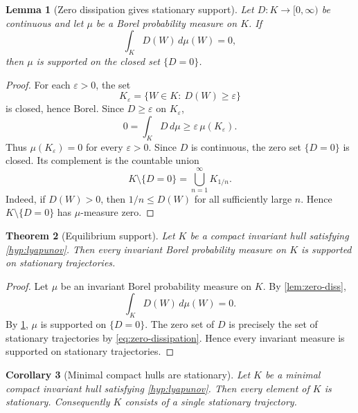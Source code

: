 \documentclass[11pt]{amsart}
\theoremstyle{plain}
\newtheorem{theorem}{Theorem}[section]
\newtheorem{lemma}[theorem]{Lemma}
\newtheorem{corollary}[theorem]{Corollary}
\theoremstyle{definition}
\theoremstyle{remark}
\numberwithin{equation}{section}
\begin{document}
\begin{lemma}[Zero dissipation gives stationary support]\label{lem:support-zero-d}
Let \(D:K\to[0,\infty)\) be continuous and let \(\mu\) be a Borel probability
measure on \(K\).  If
\[
   \int_KD(W)\,d\mu(W)=0,
\]
then \(\mu\) is supported on the closed set \(\{D=0\}\).
\end{lemma}

\begin{proof}
For each \(\varepsilon>0\), the set
\[
   K_\varepsilon=\{W\in K:\ D(W)\ge\varepsilon\}
\]
is closed, hence Borel.  Since \(D\ge\varepsilon\) on \(K_\varepsilon\),
\[
   0=\int_KD\,d\mu\ge\varepsilon\,\mu(K_\varepsilon).
\]
Thus \(\mu(K_\varepsilon)=0\) for every \(\varepsilon>0\).  Since \(D\) is
continuous, the zero set \(\{D=0\}\) is closed.  Its complement is the
countable union
\[
   K\setminus\{D=0\}
   =
   \bigcup_{n=1}^\infty K_{1/n}.
\]
Indeed, if \(D(W)>0\), then \(1/n\le D(W)\) for all sufficiently large \(n\).
Hence \(K\setminus\{D=0\}\) has \(\mu\)-measure zero.
\end{proof}

\begin{theorem}[Equilibrium support]\label{thm:equilibrium-support}
Let \(K\) be a compact invariant hull satisfying \cref{hyp:lyapunov}.  Then
every invariant Borel probability measure on \(K\) is supported on stationary
trajectories.
\end{theorem}

\begin{proof}
Let \(\mu\) be an invariant Borel probability measure on \(K\).  By
\cref{lem:zero-diss},
\[
   \int_KD(W)\,d\mu(W)=0 .
\]
By \cref{lem:support-zero-d}, \(\mu\) is supported on \(\{D=0\}\).  The zero
set of \(D\) is precisely the set of stationary trajectories by
\eqref{eq:zero-dissipation}.  Hence every invariant measure is supported on
stationary trajectories.
\end{proof}

\begin{corollary}[Minimal compact hulls are stationary]\label{cor:minimal-stationary}
Let \(K\) be a minimal compact invariant hull satisfying
\cref{hyp:lyapunov}.  Then every element of \(K\) is stationary.  Consequently
\(K\) consists of a single stationary trajectory.
\end{corollary}
\end{document}
